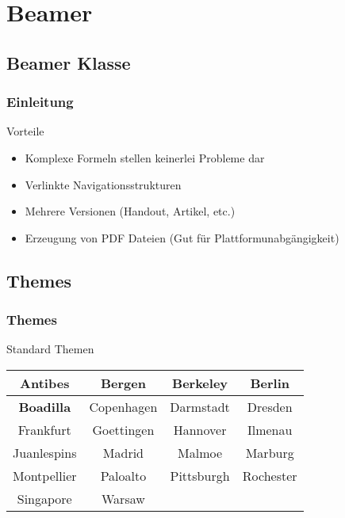 \section{Beamer}



\subsection{Beamer Klasse}

\begin{frame}[<+->]
  \frametitle{Einleitung}

  \begin{block}{Vorteile}
  \begin{itemize}
    \item Komplexe Formeln stellen keinerlei Probleme dar
    \item Verlinkte Navigationsstrukturen
    \item Mehrere Versionen (Handout, Artikel, etc.)
    \item Erzeugung von PDF Dateien (Gut für Plattformunabgängigkeit)
  \end{itemize}
  \end{block}
\end{frame}


\subsection{Themes}

\begin{frame}
  \frametitle{Themes}


  \begin{block}{Standard Themen}
  \centering
	\begin{tabular}{c|c|c|c}
		Antibes & Bergen & Berkeley & Berlin \\\hline
		\textbf{Boadilla} & Copenhagen & Darmstadt & Dresden \\\hline
		Frankfurt & Goettingen & Hannover & Ilmenau \\\hline
		Juanlespins & Madrid & Malmoe & Marburg \\\hline
		Montpellier & Paloalto & Pittsburgh & Rochester \\\hline
		Singapore & Warsaw & &
	\end{tabular}
  \end{block}
\end{frame}

